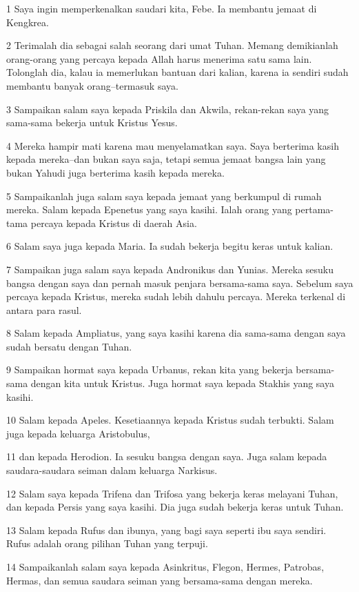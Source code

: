 \par 1 Saya ingin memperkenalkan saudari kita, Febe. Ia membantu jemaat di Kengkrea.
\par 2 Terimalah dia sebagai salah seorang dari umat Tuhan. Memang demikianlah orang-orang yang percaya kepada Allah harus menerima satu sama lain. Tolonglah dia, kalau ia memerlukan bantuan dari kalian, karena ia sendiri sudah membantu banyak orang--termasuk saya.
\par 3 Sampaikan salam saya kepada Priskila dan Akwila, rekan-rekan saya yang sama-sama bekerja untuk Kristus Yesus.
\par 4 Mereka hampir mati karena mau menyelamatkan saya. Saya berterima kasih kepada mereka--dan bukan saya saja, tetapi semua jemaat bangsa lain yang bukan Yahudi juga berterima kasih kepada mereka.
\par 5 Sampaikanlah juga salam saya kepada jemaat yang berkumpul di rumah mereka. Salam kepada Epenetus yang saya kasihi. Ialah orang yang pertama-tama percaya kepada Kristus di daerah Asia.
\par 6 Salam saya juga kepada Maria. Ia sudah bekerja begitu keras untuk kalian.
\par 7 Sampaikan juga salam saya kepada Andronikus dan Yunias. Mereka sesuku bangsa dengan saya dan pernah masuk penjara bersama-sama saya. Sebelum saya percaya kepada Kristus, mereka sudah lebih dahulu percaya. Mereka terkenal di antara para rasul.
\par 8 Salam kepada Ampliatus, yang saya kasihi karena dia sama-sama dengan saya sudah bersatu dengan Tuhan.
\par 9 Sampaikan hormat saya kepada Urbanus, rekan kita yang bekerja bersama-sama dengan kita untuk Kristus. Juga hormat saya kepada Stakhis yang saya kasihi.
\par 10 Salam kepada Apeles. Kesetiaannya kepada Kristus sudah terbukti. Salam juga kepada keluarga Aristobulus,
\par 11 dan kepada Herodion. Ia sesuku bangsa dengan saya. Juga salam kepada saudara-saudara seiman dalam keluarga Narkisus.
\par 12 Salam saya kepada Trifena dan Trifosa yang bekerja keras melayani Tuhan, dan kepada Persis yang saya kasihi. Dia juga sudah bekerja keras untuk Tuhan.
\par 13 Salam kepada Rufus dan ibunya, yang bagi saya seperti ibu saya sendiri. Rufus adalah orang pilihan Tuhan yang terpuji.
\par 14 Sampaikanlah salam saya kepada Asinkritus, Flegon, Hermes, Patrobas, Hermas, dan semua saudara seiman yang bersama-sama dengan mereka.
